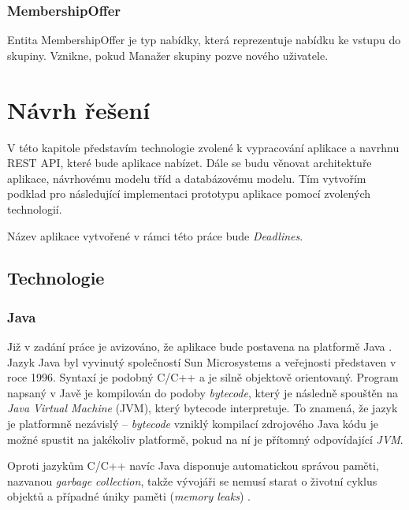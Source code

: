 \documentclass[thesis=B,czech]{FITthesis}[2012/06/26]
\begin{document}
		\subsection{MembershipOffer}
			Entita MembershipOffer je typ nabídky, která reprezentuje nabídku ke vstupu do skupiny. Vznikne, pokud Manažer skupiny pozve nového uživatele.
		
	

\chapter{Návrh řešení}
	\label{chapter:design}
	
	V této kapitole představím technologie zvolené k vypracování aplikace a navrhnu REST API, které bude aplikace nabízet. Dále se budu věnovat architektuře aplikace, návrhovému modelu tříd a databázovému modelu. Tím vytvořím podklad pro následující implementaci prototypu aplikace pomocí zvolených technologií.
	
	Název aplikace vytvořené v rámci této práce bude \textit{Deadlines}.

	\section{Technologie}
	
		\subsection{Java}
			Již v zadání práce je avizováno, že aplikace bude postavena na platformě Java \cite{java}. Jazyk Java byl vyvinutý společností Sun Microsystems a veřejnosti představen v roce 1996. Syntaxí je podobný C/C++ a je silně objektově orientovaný. Program napsaný v Javě je kompilován do podoby \textit{bytecode}, který je následně spouštěn na \textit{Java Virtual Machine} (JVM), který bytecode interpretuje. To znamená, že jazyk je platformně nezávislý -- \textit{bytecode} vzniklý kompilací zdrojového Java kódu je možné spustit na jakékoliv platformě, pokud na ní je přítomný odpovídající \textit{JVM}. 
			
			Oproti jazykům C/C++ navíc Java disponuje automatickou správou paměti, nazvanou \textit{garbage collection}, takže vývojáři se nemusí starat o životní cyklus objektů a případné úniky paměti (\textit{memory leaks}) \cite{what-is-java, pjv-java}.
		
\end{document}
